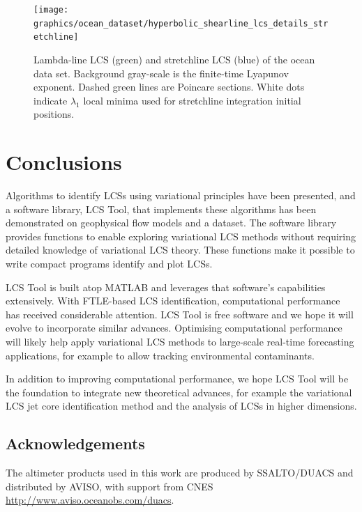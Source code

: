 \documentclass{article}
\begin{document}
\begin{figure}
\begin{center}
\texttt{[image: graphics/ocean\_dataset/hyperbolic\_shearline\_lcs\_details\_stretchline]}
\end{center}
\caption{Lambda-line LCS (green) and stretchline LCS (blue) of the ocean data set. Background gray-scale is the finite-time Lyapunov exponent. Dashed green lines are Poincare sections. White dots indicate $\lambda_1$ local minima used for stretchline integration initial positions.}
\label{f:ocean dataset hyperbolic shear lcs details stretchline}
\end{figure}

\section{Conclusions}

Algorithms to identify LCSs using variational principles have been presented, and a software library, LCS Tool, that implements these algorithms has been demonstrated on geophysical flow models and a dataset. The software library provides functions to enable exploring variational LCS methods without requiring detailed knowledge of variational LCS theory. These functions make it possible to write compact programs identify and plot LCSs.

LCS Tool is built atop MATLAB\parencite{mathworks13:_matlab} and leverages that software's capabilities extensively. With FTLE-based LCS identification, computational performance has received considerable attention\parencite{conti12:_gpu_apu_finit_time_lyapun_expon,miron12:_anisot_lagran_coher_struc}. LCS Tool is free software and we hope it will evolve to incorporate similar advances. Optimising computational performance will likely help apply variational LCS methods to large-scale real-time forecasting applications, for example to allow tracking environmental contaminants.


In addition to improving computational performance, we hope LCS Tool will be the foundation to integrate new theoretical advances, for example the variational LCS jet core identification method\parencite{farazmand13:_shearless} and the 
analysis of LCSs in higher dimensions\parencite{blazevski:_hyper_ellip_trans_barrier_three}.

\subsection*{Acknowledgements}

The altimeter products used in this work are produced by SSALTO/DUACS and distributed by AVISO, with support from CNES \url{http://www.aviso.oceanobs.com/duacs}.

\printbibliography
\end{document}
